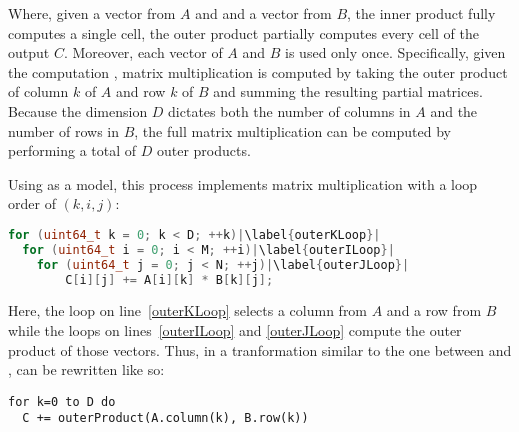 \documentclass[\main/thesis.tex]{subfiles}
\begin{document}
Where, given a vector from $A$ and and a vector from $B$, the inner product fully computes a single cell, the outer product partially computes every cell of the output $C$.
Moreover, each vector of $A$ and $B$ is used only once.
Specifically, given the computation , matrix multiplication is computed by taking the outer product of column $k$ of $A$ and row $k$ of $B$ and summing the resulting partial matrices.
Because the dimension $D$ dictates both the number of columns in $A$ and the number of rows in $B$, the full matrix multiplication can be computed by performing a total of $D$ outer products.

Using  as a model, this process implements matrix multiplication with a loop order of $(k, i, j)$:
\begin{lstlisting}[caption={[Basic Matrix Multiplication via Outer Product]A basic matrix multiplication via outer product.},label=lst:basicOuter,language=C++,columns=flexible,morekeywords=uint64_t,escapechar=|]
for (uint64_t k = 0; k < D; ++k)|\label{outerKLoop}|
  for (uint64_t i = 0; i < M; ++i)|\label{outerILoop}|
    for (uint64_t j = 0; j < N; ++j)|\label{outerJLoop}|
        C[i][j] += A[i][k] * B[k][j];
\end{lstlisting}
Here, the loop on line~\ref{outerKLoop} selects a column from $A$ and a row from $B$ while the loops on lines~\ref{outerILoop} and \ref{outerJLoop} compute the outer product of those vectors.
Thus, in a tranformation similar to the one between  and ,  can be rewritten like so:
\begin{lstlisting}[caption={[Pseudocode for Matrix Multiplication Using Outer Product]A basic matrix multiplication via outer product broken into logical concepts.},label=lst:basicOuterPseudo,columns=flexible]
for k=0 to D do
  C += outerProduct(A.column(k), B.row(k))
\end{lstlisting}
\end{document}
